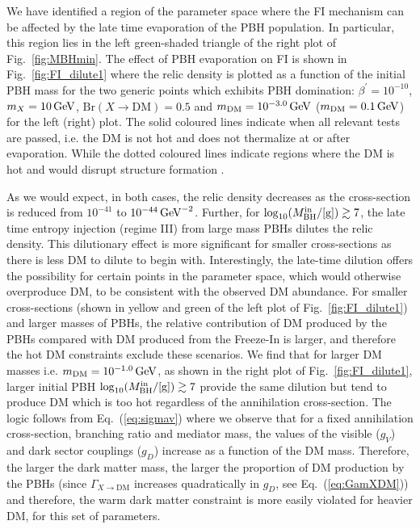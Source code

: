 \documentclass[aps,prd,reprint,twocolumn,preprintnumbers,floatfix,nofootinbib]{revtex4-1}
\newcommand{\mDM}{m_{\rm DM}}
\newcommand{\MBH}{M_{\rm BH}}
\newcommand{\figref}[1]{Fig.~\ref{#1}}
\newcommand{\equaref}[1]{Eq.~(\ref{#1})}
\begin{document}
We have identified a region of the parameter space where the FI mechanism can be affected by the late time evaporation of the PBH population. In particular, this region lies in the left green-shaded triangle of the right plot of \figref{fig:MBHmin}. The effect of PBH evaporation on FI is shown in \figref{fig:FI_dilute1} where the relic density is plotted as a function of the initial PBH mass for the two generic points which exhibits  PBH domination:  $\beta^\prime = 10^{-10}$, 
$m_X = 10\,\rm{GeV}$, $\mathrm{Br}(X\to \mathrm{DM}) = 0.5$ and  $\mDM = 10^{-3.0}\, \rm{GeV}$ ($\mDM = 0.1\, \rm{GeV}$)  for the left (right) plot. The solid coloured lines indicate when all relevant tests are passed, i.e. the DM is not hot and does not thermalize at or after evaporation. While the dotted coloured lines indicate regions where the DM is hot and would disrupt structure formation  \cite{Boyarsky:2008xj}.

As we would expect, in both cases, the relic density decreases as the cross-section is reduced from $10^{-41}$  to $10^{-44}\,\rm{GeV}^{-2}$. Further, for $\log_{10}(\MBH^{\rm in}/[\rm{g}]) \gtrsim 7$, the late time entropy injection (regime III) from large mass PBHs  dilutes the relic density. This dilutionary effect is more significant for smaller cross-sections as there is less DM to dilute to begin with. Interestingly, the late-time dilution offers the possibility for certain points in the parameter space, which would otherwise overproduce DM, to be consistent with the observed DM abundance.  For smaller cross-sections (shown in yellow and green of the left plot of  \figref{fig:FI_dilute1}) and larger masses of PBHs, the relative contribution of DM produced by the PBHs compared with DM produced from the Freeze-In is larger, and therefore the hot DM constraints exclude these scenarios.
We find that for larger DM masses i.e.  $\mDM = 10^{-1.0}\, \rm{GeV}$, as shown in the right plot of \figref{fig:FI_dilute1}, larger initial PBH $\log_{10}(\MBH^{\rm in}/[\rm{g}]) \gtrsim 7$ provide the same dilution but tend to produce DM which is too hot  regardless of the annihilation cross-section. The logic follows from \equaref{eq:sigmav} where we observe that for a fixed annihilation cross-section, branching ratio and mediator mass, the values of the visible ($g_V$) and dark sector couplings ($g_D$) increase as a function of the DM mass.  Therefore, the 
larger the dark matter mass, the larger the proportion of DM production by the PBHs (since $\Gamma_{X\to \mathrm{DM}}$ increases quadratically in $g_D$, see \equaref{eq:GamXDM}) and therefore, the warm dark matter constraint is more easily violated for heavier DM, for this set of parameters.
\end{document}
